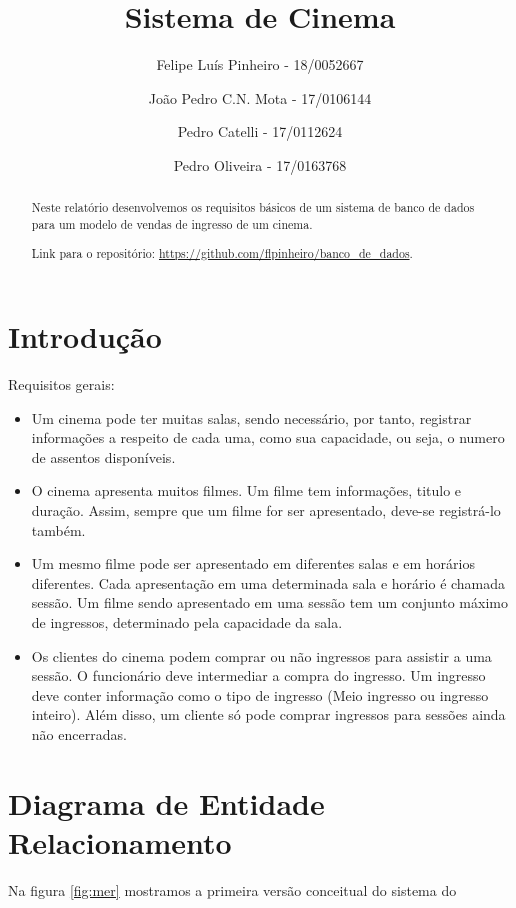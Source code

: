 \documentclass[a4paper,10pt]{article}
\title{Sistema de Cinema}
\author{
Felipe Luís Pinheiro - 18/0052667 \and 
João Pedro C.N. Mota - 17/0106144 \and 
Pedro Catelli - 17/0112624 \and
Pedro Oliveira - 17/0163768}
\begin{document}
\maketitle

\begin{abstract}
Neste relatório desenvolvemos os requisitos básicos de um sistema de banco de dados para um modelo de vendas de ingresso de um cinema. 

Link para o repositório: \url{https://github.com/flpinheiro/banco_de_dados}. 
\end{abstract}

\section{Introdução}

Requisitos gerais:

\begin{itemize}
	\item Um cinema pode ter muitas salas, sendo necessário, por tanto, registrar informações a respeito de cada uma, como sua capacidade, ou seja, o numero de assentos disponíveis.
	\item O cinema apresenta muitos filmes. Um filme tem informações, titulo e duração. Assim, sempre que um filme for ser apresentado, deve-se registrá-lo também.
	\item Um mesmo filme pode ser apresentado em diferentes salas e em horários diferentes. Cada apresentação em uma determinada sala e horário é chamada sessão. Um filme sendo apresentado em uma sessão tem um conjunto máximo de ingressos, determinado pela capacidade da sala.
	\item Os clientes do cinema podem comprar ou não ingressos para assistir a uma sessão. O
funcionário deve intermediar a compra do ingresso. Um ingresso deve conter informação
como o tipo de ingresso (Meio ingresso ou ingresso inteiro). Além disso, um cliente só pode
comprar ingressos para sessões ainda não encerradas.
\end{itemize}

\section{Diagrama de Entidade Relacionamento}

Na figura \ref{fig:mer} mostramos a primeira versão conceitual do sistema do
\end{document}
